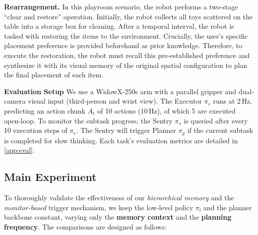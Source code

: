 \textbf{Rearrangement.} 
In this playroom scenario, the robot performs a two-stage ``clear and restore'' operation. Initially, the robot collects all toys scattered on the table into a storage box for cleaning. After a temporal interval, the robot is tasked with restoring the items to the environment. Crucially, the user's specific placement preference is provided beforehand as prior knowledge. Therefore, to execute the restoration, the robot must recall this pre-established preference and synthesize it with its visual memory of the original spatial configuration to plan the final placement of each item.

\textbf{Evaluation Setup}
We use a WidowX-250s arm with a parallel gripper and dual-camera visual input (third-person and wrist view). The Executor $\pi_e$ runs at 2\,Hz, predicting an action chunk $A_t$ of 10 actions (10\,Hz), of which 5 are executed open-loop. To monitor the subtask progress, the Sentry $\pi_s$ is queried after every 10 execution steps of $\pi_e$. The Sentry will trigger Planner $\pi_p$ if the current subtask is completed for slow thinking.
Each task’s evaluation metrics are detailed in \autoref{app:eval}.




\subsection{Main Experiment}


To thoroughly validate the effectiveness of our \emph{hierarchical memory} and the \emph{monitor-based} trigger mechanism, we keep the low-level policy $\pi_{\text{l}}$ and the planner backbone constant, varying only the \textbf{memory context} and the \textbf{planning frequency}. The comparisons are designed as follows:


